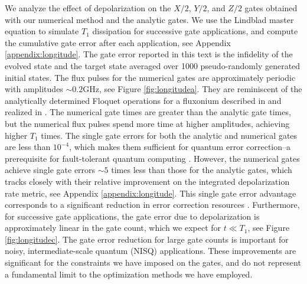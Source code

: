 We analyze the effect of depolarization on
the $X/2$, $Y/2$, and $Z/2$ gates obtained with
our numerical method and the analytic gates. We
use the Lindblad master equation to simulate $T_{1}$ dissipation for successive
gate applications, and compute the cumulative gate error
after each application, see Appendix \ref{appendix:longitude}.
The gate error reported in this text is the infidelity
of the evolved state and the target state averaged over 1000 pseudo-randomly
generated initial states.
The flux pulses for the numerical gates
are approximately periodic
with amplitudes $\sim 0.2 \textrm{GHz}$, see Figure \ref{fig:longitudea}.
They are reminiscent of the analytically determined Floquet operations
for a fluxonium described in \cite{huang2020engineering}
and realized in \cite{mundada2020floquet}.
The numerical gate times are greater
than the analytic gate times, but the
numerical flux pulses
spend more time at higher amplitudes, achieving higher $T_{1}$ times.
The single gate errors for both the analytic and numerical gates are
less than $10^{-4}$, which makes them sufficient for quantum error correction--a
prerequisite for fault-tolerant quantum
computing \cite{aharonov2008fault, knill2005quantum, gottesman1997stabilizer}.
However, the numerical gates achieve single gate errors
$\sim 5$ times less than those for the analytic gates,
which tracks closely with their relative improvement
on the integrated depolarization rate metric, see Appendix \ref{appendix:longitude}.
This single gate error advantage corresponds to a significant reduction in error correction resources
.
Furthermore, for successive gate applications, the gate error due to depolarization is approximately linear
in the gate count, which we expect for $t \ll T_{1}$, see Figure \ref{fig:longitudec}.
The gate error reduction for large gate counts is important for noisy, intermediate-scale quantum (NISQ)
applications. These improvements are significant for the constraints we have imposed on the gates,
and do not represent a fundamental limit to the optimization methods we have employed.
